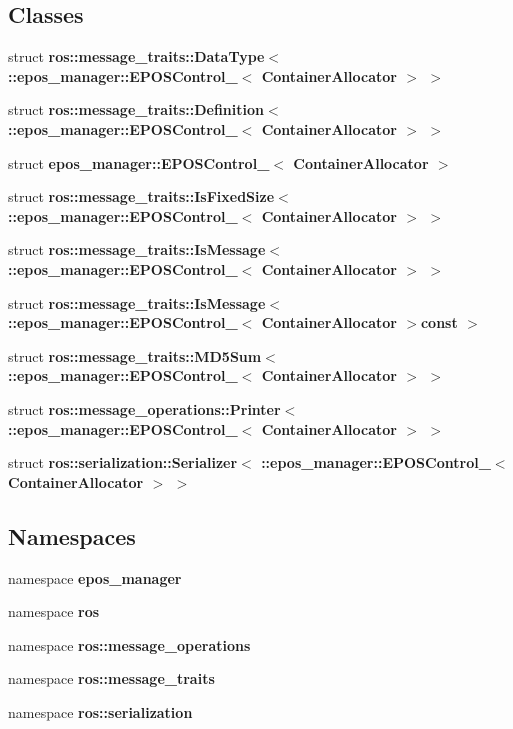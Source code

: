 \subsection*{\-Classes}
\begin{DoxyCompactItemize}
\item 
struct {\bf ros\-::message\-\_\-traits\-::\-Data\-Type$<$ \-::epos\-\_\-manager\-::\-E\-P\-O\-S\-Control\-\_\-$<$ Container\-Allocator $>$ $>$}
\item 
struct {\bf ros\-::message\-\_\-traits\-::\-Definition$<$ \-::epos\-\_\-manager\-::\-E\-P\-O\-S\-Control\-\_\-$<$ Container\-Allocator $>$ $>$}
\item 
struct {\bf epos\-\_\-manager\-::\-E\-P\-O\-S\-Control\-\_\-$<$ Container\-Allocator $>$}
\item 
struct {\bf ros\-::message\-\_\-traits\-::\-Is\-Fixed\-Size$<$ \-::epos\-\_\-manager\-::\-E\-P\-O\-S\-Control\-\_\-$<$ Container\-Allocator $>$ $>$}
\item 
struct {\bf ros\-::message\-\_\-traits\-::\-Is\-Message$<$ \-::epos\-\_\-manager\-::\-E\-P\-O\-S\-Control\-\_\-$<$ Container\-Allocator $>$ $>$}
\item 
struct {\bf ros\-::message\-\_\-traits\-::\-Is\-Message$<$ \-::epos\-\_\-manager\-::\-E\-P\-O\-S\-Control\-\_\-$<$ Container\-Allocator $>$const  $>$}
\item 
struct {\bf ros\-::message\-\_\-traits\-::\-M\-D5\-Sum$<$ \-::epos\-\_\-manager\-::\-E\-P\-O\-S\-Control\-\_\-$<$ Container\-Allocator $>$ $>$}
\item 
struct {\bf ros\-::message\-\_\-operations\-::\-Printer$<$ \-::epos\-\_\-manager\-::\-E\-P\-O\-S\-Control\-\_\-$<$ Container\-Allocator $>$ $>$}
\item 
struct {\bf ros\-::serialization\-::\-Serializer$<$ \-::epos\-\_\-manager\-::\-E\-P\-O\-S\-Control\-\_\-$<$ Container\-Allocator $>$ $>$}
\end{DoxyCompactItemize}
\subsection*{\-Namespaces}
\begin{DoxyCompactItemize}
\item 
namespace {\bf epos\-\_\-manager}
\item 
namespace {\bf ros}
\item 
namespace {\bf ros\-::message\-\_\-operations}
\item 
namespace {\bf ros\-::message\-\_\-traits}
\item 
namespace {\bf ros\-::serialization}
\end{DoxyCompactItemize}
